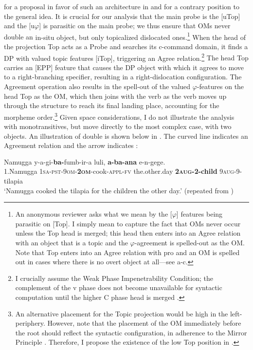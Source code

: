 \documentclass[output=paper,newtxmath,modfonts,nonflat,hidelinks]{langsci/langscibook}
\begin{document}
{\citet{landmantoappear} for a proposal in favor of such an architecture in  and \citet{horvath2007} for a contrary position to the general idea.}{ It is crucial for our analysis that the main probe is the [uTop] and the [u$\varphi $] is parasitic on the main probe; we thus ensure that OMs never double an} in-situ {object, but only topicalized dislocated ones}.\footnote{An anonymous reviewer asks what we mean by the [$\varphi $] features being parasitic on [Top]. I simply mean to capture the fact that OMs never occur unless the Top head is merged; this head then enters into an Agree relation with an object that is a topic and the $\varphi $-agreement is spelled-out as the OM. Note that Top enters into an Agree relation with pro and an OM is spelled out in cases where there is no overt object at all—see a-c.}{ When the head of the projection Top acts as a Probe and searches its c-command domain, it finds a DP with valued topic features [iTop], triggering an Agree relation}.\footnote{I crucially assume the Weak Phase Impenetrability Condition; the complement of the v phase does not become unavailable for syntactic computation until the higher C phase head is merged \citep{Citko2014}.}{ The head Top carries an [EPP] feature that causes the DP object with which it agrees to move to a right-branching specifier, resulting in a right-dislocation configuration. The Agreement operation also results in the spell-out of the valued $\varphi $-features on the head Top as the  OM, which then joins with the verb as the verb moves up through the structure to reach its final landing place, accounting for the morpheme order}.\footnote{An alternative placement for the Topic projection would be high in the left-periphery. However, note that the placement of the OM immediately before the root should reflect the syntactic configuration, in adherence to the Mirror Principle \citep{Baker1985}. Therefore, I propose the existence of the low Top position in .}{ Given space considerations, I do not illustrate the analysis with monotransitives, but move directly to the most complex case, with two objects. An illustration of double  is shown below in . The curved line indicates an Agreement relation and the arrow indicates :}

\largerpage
\ea\label{ex:ranero:31}
\gll Namugga     y-a-gi{}-\textbf{ba-}fumb-ir-a                     luli,                \textbf{a-ba-ana}      e-n-gege.\\
1.Namugga \textsc{1sa-pst-9om}\textsc{{}-}\textbf{\textsc{2om}}{}-cook-\textsc{appl-fv} the.other.day \textbf{2\textsc{aug}}\textbf{{}-2-child} 9\textsc{aug}{}-9-tilapia\\
\glt ‘Namugga cooked the tilapia for the children the other day.’ (repeated from )
\z
\end{document}
